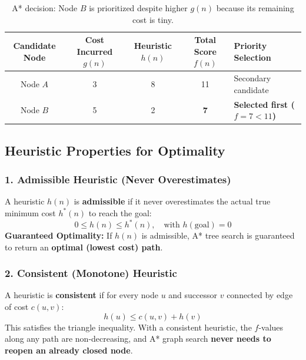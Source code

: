\begin{table}[htbp]
\centering
\small
\begin{tabular}{c c c c l}
\toprule
\textbf{Candidate Node} & \textbf{Cost Incurred $g(n)$} & \textbf{Heuristic $h(n)$} & \textbf{Total Score $f(n)$} & \textbf{Priority Selection} \\
\midrule
Node $A$ & 3 & 8 & 11 & Secondary candidate \\
Node $B$ & 5 & 2 & \textbf{7} & \textbf{Selected first ($f=7 < 11$)} \\
\bottomrule
\end{tabular}
\caption{A* decision: Node $B$ is prioritized despite higher $g(n)$ because its remaining cost is tiny.}
\end{table}

\subsection{Heuristic Properties for Optimality}

\subsubsection{1. Admissible Heuristic (Never Overestimates)}
A heuristic $h(n)$ is \textbf{admissible} if it never overestimates the actual true minimum cost $h^*(n)$ to reach the goal:
\[
\boxed{0 \leq h(n) \leq h^*(n), \quad \text{with } h(\text{goal}) = 0}
\]
\textbf{Guaranteed Optimality:} If $h(n)$ is admissible, A* tree search is guaranteed to return an \textbf{optimal (lowest cost) path}.

\subsubsection{2. Consistent (Monotone) Heuristic}
A heuristic is \textbf{consistent} if for every node $u$ and successor $v$ connected by edge of cost $c(u, v)$:
\[
\boxed{h(u) \leq c(u, v) + h(v)}
\]
This satisfies the triangle inequality. With a consistent heuristic, the $f$-values along any path are non-decreasing, and A* graph search \textbf{never needs to reopen an already closed node}.


